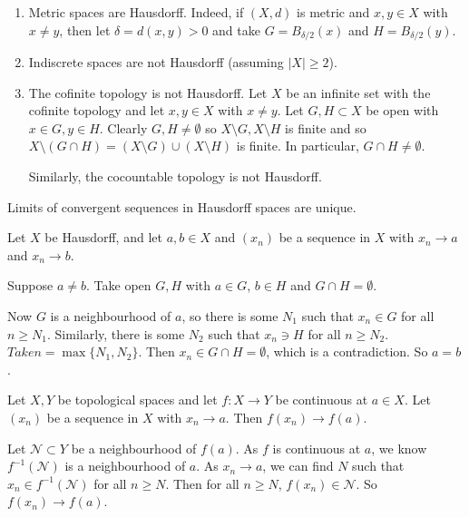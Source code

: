 \documentclass[12pt]{article}
\begin{document}
\begin{exbox}
	\begin{enumerate}[1.]
		\item Metric spaces are Hausdorff. Indeed, if $(X, d)$ is metric and $x, y \in X$ with $x \neq y$, then let $\delta = d(x, y) > 0$ and take $G = B_{\delta/2}(x)$ and $H = B_{\delta/2}(y)$.
		\item Indiscrete spaces are not Hausdorff (assuming $|X| \geq 2$).
		\item The cofinite topology is not Hausdorff. Let $X$ be an infinite set with the cofinite topology and let $x, y \in X$ with $x \neq y$. Let $G, H \subset X$ be open with $x \in G, y \in H$. Clearly $G, H \neq \emptyset$ so $X \setminus G, X \setminus H$ is finite and so $X \setminus (G \cap H) = (X \setminus G) \cup (X \setminus H)$ is finite. In particular, $G \cap H \neq \emptyset$.

			Similarly, the cocountable topology is not Hausdorff.
	\end{enumerate}
\end{exbox}

\begin{proposition}
	Limits of convergent sequences in Hausdorff spaces are unique.
\end{proposition}

\begin{proofbox}
	Let $X$ be Hausdorff, and let $a, b \in X$ and $(x_n)$ be a sequence in $X$ with $x_n \to a$ and $x_n \to b$.

	Suppose $a \neq b$. Take open $G, H$ with $a \in G$, $b \in H$ and $G \cap H = \emptyset$.
	
	Now $G$ is a neighbourhood of $a$, so there is some $N_1$ such that $x_n \in G$ for all $n \geq N_1$. Similarly, there is some $N_2$ such that $x_n \ni H$ for all $n \geq N_2$. $Take n = \max\{N_1, N_2\}$. Then $x_n \in G \cap H = \emptyset$, which is a contradiction. So $a = b$.
\end{proofbox}

\begin{proposition}
	Let $X, Y$ be topological spaces and let $f : X \to Y$ be continuous at $a \in X$. Let $(x_n)$ be a sequence in $X$ with $x_n \to a$. Then $f(x_n) \to f(a)$.
\end{proposition}

\begin{proofbox}
	Let $\mathcal{N} \subset Y$ be a neighbourhood of $f(a)$. As $f$ is continuous at $a$, we know $f^{-1}(\mathcal{N})$ is a neighbourhood of $a$. As $x_n \to a$, we can find $N$ such that $x_n \in f^{-1}(\mathcal{N})$ for all $n \geq N$. Then for all $n \geq N$, $f(x_n) \in \mathcal{N}$. So $f(x_n) \to f(a)$.
\end{proofbox}
\end{document}
